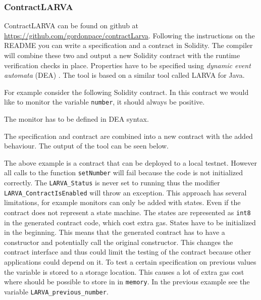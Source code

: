 \documentclass[a4paper]{article}
\begin{document}
\subsubsection{ContractLARVA}
ContractLARVA can be found on github at \url{https://github.com/gordonpace/contractLarva}. Following the instructions on the README you can write a specification and a contract in Solidity. The compiler will combine these two and output a new Solidity contract with the runtime verification checks in place. Properties have to be specified using \textit{dynamic event automata} (DEA) \cite{CGG08FMICS}. The tool is based on a similar tool called LARVA for Java. \par
For example consider the following Solidity contract. In this contract we would like to monitor the variable \texttt{number}, it should always be positive.

The monitor has to be defined in DEA syntax.

The specification and contract are combined into a new contract with the added behaviour. The output of the tool can be seen below.

The above example is a contract that can be deployed to a local testnet. However all calls to the function \texttt{setNumber} will fail because the code is not initialized correctly. The \texttt{LARVA\_Status} is never set to running thus the modifier \texttt{LARVA\_ContractIsEnabled} will throw an exception. This approach has several limitations, for example monitors can only be added with states. Even if the contract does not represent a state machine. The states are represented as \texttt{int8} in the generated contract code, which cost extra gas. States have to be initialized in the beginning. This means that the generated contract has to have a constructor and potentially call the original constructor. This changes the contract interface and thus could limit the testing of the contract because other applications could depend on it. To test a certain specification on previous values the variable is stored to a storage location. This causes a lot of extra gas cost where should be possible to store in in \texttt{memory}. In the previous example see the variable \texttt{LARVA\_previous\_number}.
\end{document}
